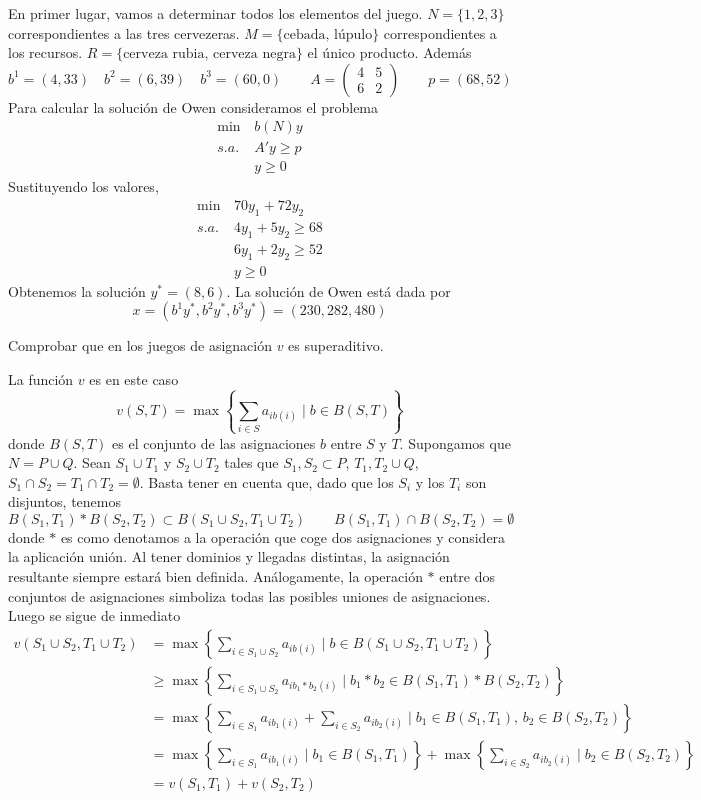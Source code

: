 \documentclass[twoside]{article}
\begin{document}
\begin{solucion}
En primer lugar, vamos a determinar todos los elementos del juego. $N=\{1,2,3\}$ correspondientes a las tres cervezeras. $M=\{\text{cebada, lúpulo}\}$ correspondientes a los recursos. $R=\{\text{cerveza rubia, cerveza negra}\}$ el único producto. Además
$$
b^1 = (4,33) \quad b^2 =(6,39) \quad b^3 = (60,0) \qquad A = \begin{pmatrix}
4 & 5\\
6 & 2
\end{pmatrix} \qquad p = (68,52)
$$
Para calcular la solución de Owen consideramos el problema
\begin{align*}
\min\, & b(N)y\\
s.a.\,&A'y\geq p\\
& y\geq 0
\end{align*}
Sustituyendo los valores,
\begin{align*}
\min\, & 70y_1 + 72y_2\\
s.a.\,&
4y_1 + 5y_2\geq 68\\
&6y_1 + 2y_2 \geq 52\\
& y\geq 0
\end{align*}
Obtenemos la solución $y^* = (8,6)$. La solución de Owen está dada por
$$
x = (b^1y^*,b^2y^*,b^3y^*) = (230,282,480) 
$$
\end{solucion}
\newpage
\begin{ejercicio}{10}
Comprobar que en los juegos de asignación $v$ es superaditivo.
\end{ejercicio}
\begin{solucion}
La función $v$ es en este caso
$$
v(S,T) = \max\left\{\sum_{i\in S} a_{ib(i)} \mid b \in B(S,T)\right\}
$$
donde $B(S,T)$ es el conjunto de las asignaciones $b$ entre $S$ y $T$. Supongamos que $N= P\cup Q$. Sean $S_1 \cup T_1$ y $S_2 \cup T_2$ tales que $S_1,S_2 \subset P$, $T_1,T_2 \cup Q$, $S_1\cap S_2 = T_1 \cap T_2 = \emptyset$. Basta tener en cuenta que, dado que los $S_i$ y los $T_i$ son disjuntos, tenemos
$$
B(S_1,T_1)* B(S_2,T_2) \subset B(S_1\cup S_2, T_1\cup T_2) \qquad B(S_1,T_1)\cap B(S_2,T_2) = \emptyset
$$
donde $*$ es como denotamos a la operación que coge dos asignaciones y considera la aplicación unión. Al tener dominios y llegadas distintas, la asignación resultante siempre estará bien definida. Análogamente, la operación $*$ entre dos conjuntos de asignaciones simboliza todas las posibles uniones de asignaciones.
Luego se sigue de inmediato
\begin{align*}
v(S_1\cup S_2, T_1\cup T_2) &= \max\left\{\sum_{i\in S_1 \cup S_2} a_{ib(i)} \mid b \in B(S_1\cup S_2, T_1\cup T_2)\right\}\\
&\geq  \max\left\{\sum_{i\in S_1 \cup S_2} a_{ib_1*b_2(i)} \mid b_1*b_2 \in B(S_1,T_1)* B(S_2,T_2)\right\}\\
&=  \max\left\{\sum_{i\in S_1} a_{ib_1(i)} + \sum_{i \in S_2} a_{ib_2(i)} \mid b_1 \in B(S_1,T_1),\, b_2\in B(S_2,T_2)\right\}\\
&= \max\left\{\sum_{i\in S_1} a_{ib_1(i)} \mid b_1 \in B(S_1,T_1)\right\}+   \max\left\{\sum_{i \in S_2} a_{ib_2(i)} \mid b_2\in B(S_2,T_2)\right\}\\
&=v(S_1,T_1) + v(S_2,T_2)
\end{align*}

\end{solucion}
\end{document}
